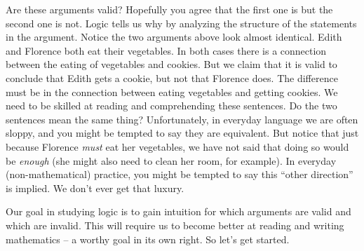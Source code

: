 \documentclass[12pt]{article}
\begin{document}
Are these arguments valid?  Hopefully you agree that the first one is but the second one is not.  Logic tells us why by analyzing the structure of the statements in the argument.  Notice the two arguments above look almost identical.  Edith and Florence both eat their vegetables.  In both cases there is a connection between the eating of vegetables and cookies.  But we claim that it is valid to conclude that Edith gets a cookie, but not that Florence does.  The difference must be in the connection between eating vegetables and getting cookies.  We need to be skilled at reading and comprehending these sentences.  Do the two sentences mean the same thing?  Unfortunately, in everyday language we are often sloppy, and you might be tempted to say they are equivalent.  But notice that just because Florence \emph{must} eat her vegetables, we have not said that doing so would be \emph{enough} (she might also need to clean her room, for example).  In everyday (non-mathematical) practice, you might be tempted to
say this ``other direction'' is implied.  We don't ever get that luxury.

Our goal in studying logic is to gain intuition for which arguments are valid and which are invalid.  This will require us to become better at reading and writing mathematics -- a worthy goal in its own right.  So let's get started.
\end{document}

